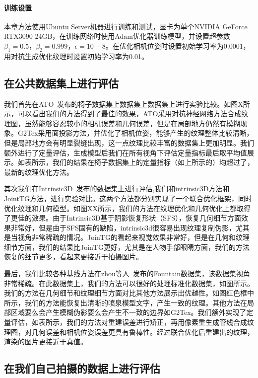 \paragraph*{训练设置}
本章方法使用Ubuntu Server机器进行训练和测试，显卡为单个NVIDIA GeForce RTX3090 24GB，在训练网络时使用Adam优化器训练模型，并设置超参数$\beta_1=0.5，\beta_2=0.999，\epsilon =10-8$。在优化相机位姿时设置初始学习率为0.0001，用对抗生成优化纹理时设置初始学习率为0.01。


\subsection{在公共数据集上进行评估}
我们首先在ATO~\cite{JingweiHuang2020AdversarialTO}发布的椅子数据集上数据集上数据集上进行实验比较。如图X所示，可以看出我们的方法得到了最佳的效果，ATO采用对抗神经网络方法合成纹理图，虽然能够容忍较小的相机误差和几何误差，但是在局部地方仍然有模糊现象。G2Tex采用面投影方法，并优化了相机位姿，能够产生的纹理整体比较清晰，但是局部地方会有明显裂缝出现，这一点纹理比较丰富的数据集上更加明显。我们额外进行了定量评估，生成模型后我们在所有视角下评估定量指标最后取平均值展示。如表所示，我们的结果在椅子数据集上的定量指标（如上所示的）均超过了，最新的纹理优化方法。\par
其次我们在Intrinsic3D~\cite{RobertMaier2017Intrinsic3DH3}发布的数据集上进行评估,我们和intrinsic3D方法和JointTG方法，进行实验对比。这两个方法都分别实现了一个联合优化框架，同时优化纹理和几何模型。如图XX所示，我们的方法在纹理优化和几何优化上都取得了更佳的效果。由于Intrinsic3D基于阴影恢复形状（SFS），恢复几何细节方面效果非常好，但是由于SFS固有的缺陷，intrinsic3d很容易出现纹理复制伪影，尤其是当视角非常稀疏的情况。JoinTG的看起来视觉效果非常好，但是在几何和纹理细节方面，我们的结果比JoinTG更好，尤其是在人物手部眼睛方面，我们的方法恢复的细节更多，看起来更接近于拍摄图片。\par
最后，我们比较各种基线方法在zhou等人~\cite{Zhou2018}发布的Fountain数据集，该数据集视角非常稀疏。在此数据集上，我们的方法可以很好的处理标准化数据集，如图所示。我们的方法在几何细节和纹理细节方面对比其他方法展示出优越性。如图红色框中所示，我们的方法能恢复出清晰的喷泉模型文字，产生一致的纹理。其他方法在局部区域要么会产生模糊伪影要么会产生不一致的边界如G2Tex。我们额外实现了定量评估，如表所示，我们的方法对重建误差进行矫正，再用像素重生成管线合成纹理图，对几何误差和相机位姿误差更具有鲁棒性。经过联合优化后重建出的纹理，渲染的图片更接近于真值。\par
\subsection{在我们自己拍摄的数据上进行评估}
